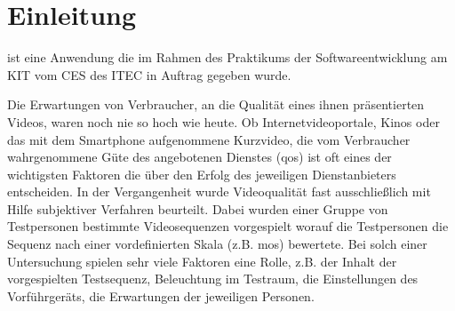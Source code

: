 \chapter{Einleitung}

\projektTitel ist eine Anwendung die im Rahmen des Praktikums der Softwareentwicklung am \gls{KIT} vom
\gls{CES} des \gls{ITEC} in Auftrag gegeben wurde. 

Die Erwartungen von Verbraucher, an die Qualität eines ihnen präsentierten Videos, waren noch nie so hoch wie
heute. Ob Internetvideoportale, Kinos  oder das mit dem Smartphone aufgenommene Kurzvideo, die
vom Verbraucher wahrgenommene Güte des angebotenen Dienstes (\gls{qos}) ist oft eines der wichtigsten
Faktoren die über den Erfolg des jeweiligen Dienstanbieters entscheiden. In der Vergangenheit wurde
Videoqualität fast ausschließlich mit Hilfe subjektiver Verfahren beurteilt. Dabei wurden
einer Gruppe von Testpersonen bestimmte Videosequenzen vorgespielt worauf die Testpersonen
die Sequenz nach einer vordefinierten Skala (z.B. \gls{mos}) bewertete. Bei solch einer Untersuchung
spielen sehr viele Faktoren eine Rolle, z.B. der Inhalt der vorgespielten Testsequenz, Beleuchtung
im Testraum, die Einstellungen des Vorführgeräts, die Erwartungen der jeweiligen Personen.

